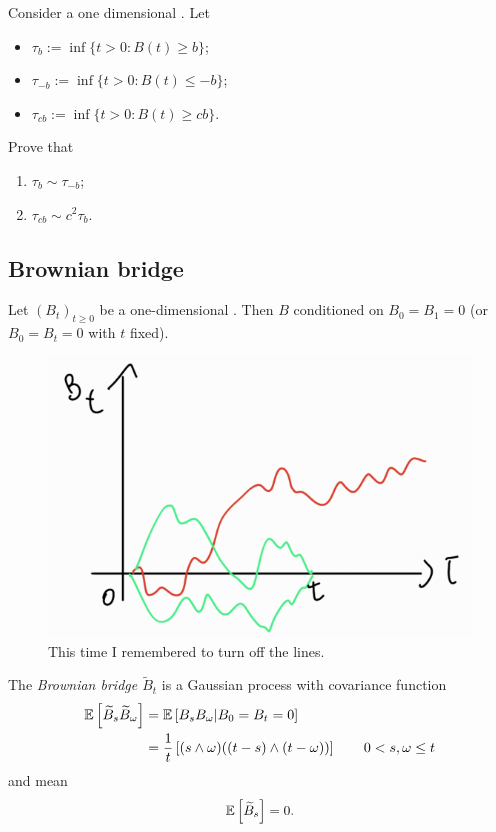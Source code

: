 \documentclass[12pt]{report}
\begin{document}
\begin{exercise}
	Consider a one dimensional \bwm. Let
	\begin{itemize}
		\item $\tau_{b}:=\inf\{t>0:B(t)\geq b\}$;
		\item $\tau_{-b}:=\inf\{t>0:B(t)\leq -b\}$;
		\item $\tau_{cb}:=\inf\{t>0:B(t)\geq cb\}$.
	\end{itemize}
	Prove that
	\begin{enumerate}
		\item $\tau_{b}\sim\tau_{-b}$;
		\item $\tau_{cb}\sim c^{2}\tau_{b}$.
	\end{enumerate}
\end{exercise}
\subsection{Brownian bridge}
\begin{definition}
	Let ${(B_{t})}_{t\geq 0}$ be a one-dimensional \bwm{}. Then $B$ conditioned on $B_{0}=B_{1}=0$ (or $B_{0}=B_{t}=0$ with $t$ fixed).
\end{definition}
\begin{figure}[h]
	\centering
	\includegraphics[width=0.5\linewidth]{img/screenshot036}
	\caption{This time I remembered to turn off the lines.}
	\label{fig:screenshot036}
\end{figure}
\begin{theorem}
	The \emph{Brownian bridge $\widetilde{B}_{t}$} is a Gaussian process with covariance function
	\begin{align*}
		\mathbb{E}\left[\widetilde{B}_{s}\widetilde{B}_{\omega}\right]&=\mathbb{E}\left[B_{s}B_{\omega}|B_{0}=B_{t}=0\right]\\
		&=\frac{1}{t}\left[(s\wedge\omega)((t-s)\wedge(t-\omega))\right]\qquad0<s,\omega\leq t
	\end{align*}
	and mean
	\begin{equation*}
		\mathbb{E}\left[\widetilde{B}_{s}\right]=0.
	\end{equation*}
\end{theorem}
\end{document}
